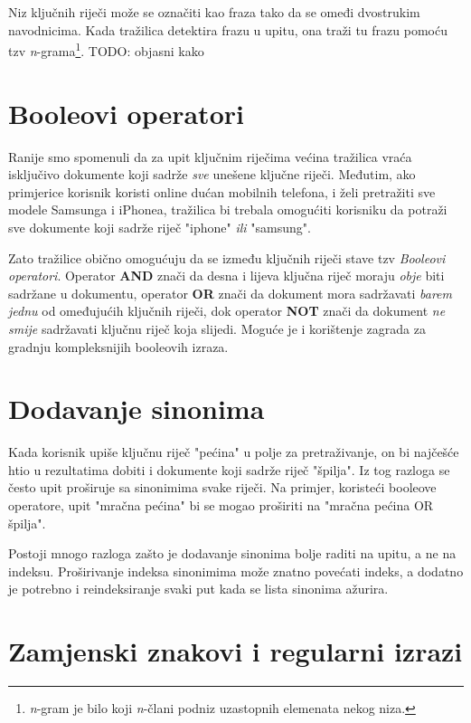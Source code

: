\documentclass[11pt]{scrreprt}
\begin{document}
Niz ključnih riječi može se označiti kao fraza tako da se omeđi dvostrukim navodnicima. Kada tražilica detektira frazu u upitu, ona traži tu frazu pomoću tzv \textit{n}-grama\footnote{\textit{n}-gram je bilo koji \textit{n}-člani podniz uzastopnih elemenata nekog niza.}. TODO: objasni kako

\section{Booleovi operatori}

Ranije smo spomenuli da za upit ključnim riječima većina tražilica vraća isključivo dokumente koji sadrže \textit{sve} unešene ključne riječi. Međutim, ako primjerice korisnik koristi online dućan mobilnih telefona, i želi pretražiti sve modele Samsunga i iPhonea, tražilica bi trebala omogućiti korisniku da potraži sve dokumente koji sadrže riječ "iphone" \textit{ili} "samsung".

Zato tražilice obično omogućuju da se između ključnih riječi stave tzv \textit{Booleovi operatori}. Operator \textbf{AND} znači da desna i lijeva ključna riječ moraju \textit{obje} biti sadržane u dokumentu, operator \textbf{OR} znači da dokument mora sadržavati \textit{barem jednu} od omeđujućih ključnih riječi, dok operator \textbf{NOT} znači da dokument \textit{ne smije} sadržavati ključnu riječ koja slijedi. Moguće je i korištenje zagrada za gradnju kompleksnijih booleovih izraza.

\section{Dodavanje sinonima}

Kada korisnik upiše ključnu riječ "pećina" u polje za pretraživanje, on bi najčešće htio u rezultatima dobiti i dokumente koji sadrže riječ "špilja". Iz tog razloga se često upit proširuje sa sinonimima svake riječi. Na primjer, koristeći booleove operatore, upit "mračna pećina" bi se mogao proširiti na "mračna pećina OR špilja".

Postoji mnogo razloga zašto je dodavanje sinonima bolje raditi na upitu, a ne na indeksu. Proširivanje indeksa sinonimima može znatno povećati indeks, a dodatno je potrebno i reindeksiranje svaki put kada se lista sinonima ažurira.

\section{Zamjenski znakovi i regularni izrazi}
\end{document}
